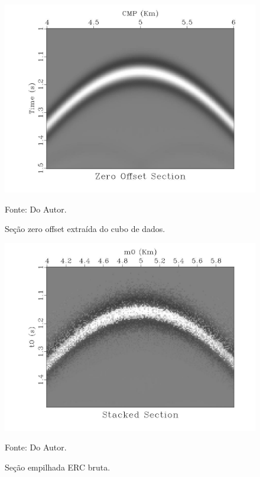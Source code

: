 \begin{figure}
\caption{Seção zero offset extraída do cubo de dados.}
\begin{center}
\includegraphics[scale=0.4]{images/zeroOffsetSection.jpeg}
\vspace{-0.3cm}
\end{center}
\begin{center}
 Fonte: Do Autor.
\end{center}
\label{fig:7.8}
\end{figure}

\begin{figure}
\caption{Seção empilhada ERC bruta.}
\begin{center}
\includegraphics[scale=0.4]{images/stackedSection.jpeg}
\vspace{-0.3cm}
\end{center}
\begin{center}
 Fonte: Do Autor.
\end{center}
\label{fig:7.9}
\end{figure}

